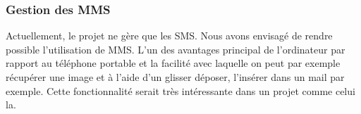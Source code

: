 \subsubsection{Gestion des MMS}

Actuellement, le projet ne gère que les SMS. Nous avons envisagé de rendre possible l'utilisation de MMS. L'un des avantages principal
de l'ordinateur par rapport au téléphone portable et la facilité avec laquelle on peut par exemple récupérer une image et à l'aide d'un
glisser déposer, l'insérer dans un mail par exemple. Cette fonctionnalité serait très intéressante dans un projet comme celui la. 
